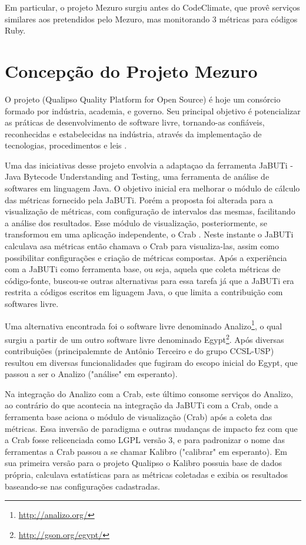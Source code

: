 Em particular, o projeto Mezuro surgiu antes do CodeClimate, que provê serviços similares aos pretendidos pelo Mezuro, mas monitorando 3 métricas para códigos Ruby.

\section{Concepção do Projeto Mezuro}

O projeto (Qualipso Quality Platform for Open Source) é hoje um consórcio formado por indústria, academia, e governo. Seu principal objetivo é potencializar as práticas de desenvolvimento de software livre, tornando-as confiáveis, reconhecidas e estabelecidas na indústria, através da implementação de tecnologias, procedimentos e leis \cite{qualipso2009}. 
	
Uma das iniciativas desse projeto envolvia  a adaptaçao da ferramenta JaBUTi - Java Bytecode Understanding and Testing, uma ferramenta de análise de softwares em linguagem Java. O objetivo inicial era melhorar o módulo de cálculo das métricas fornecido pela JaBUTi. Porém a proposta foi alterada para a visualização de métricas, com configuração de intervalos das mesmas, facilitando a análise dos resultados. Esse módulo de visualização, posteriormente, se transformou em uma aplicação independente, o Crab \cite{meirelles2009crab}. Neste instante o JaBUTi calculava asa métricas então chamava o Crab para visualiza-las, assim como possibilitar configurações e criação de métricas compostas. Após a experiência com a JaBUTi como ferramenta base, ou seja, aquela que coleta métricas de código-fonte, buscou-se outras alternativas para essa tarefa já que a JaBUTi era restrita a códigos escritos  em liguagem Java, o que limita a contribuição com softwares livre.

Uma alternativa encontrada foi o software livre denominado Analizo\footnote{\url{http://analizo.org/}}, o qual surgiu a partir de um outro software livre denominado Egypt\footnote{\url{http://gson.org/egypt/}}. Após diversas contribuições (principalemnte de Antônio Terceiro e do grupo CCSL-USP) resultou em diversas funcionalidades que fugiram do escopo inicial do Egypt, que passou a ser o Analizo ("análise" em esperanto). %

Na integração do Analizo com a Crab, este último consome serviços do Analizo, ao contrário do que acontecia na integração da JaBUTi com a Crab, onde a ferramenta base aciona o módulo de visualização (Crab) após a coleta das métricas. Essa inversão de paradigma e outras mudanças de impacto fez com que a Crab fosse relicenciada como LGPL versão 3, e para padronizar o nome das ferramentas a Crab passou a se chamar Kalibro ("calibrar" em esperanto). Em sua primeira versão para o projeto Qualipso o Kalibro possuia base de dados própria, calculava estatísticas para as métricas coletadas e exibia os resultados baseando-se nas configurações cadastradas. 

